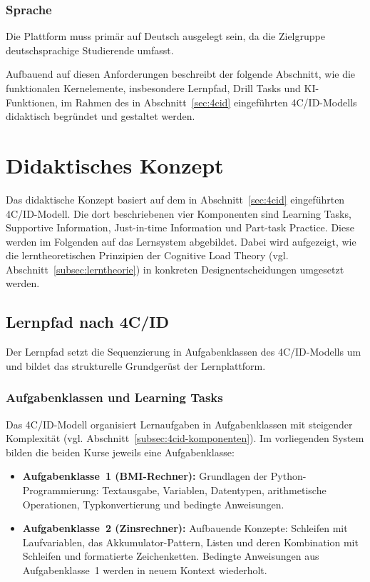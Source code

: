 \subsubsection{Sprache}

Die Plattform muss primär auf Deutsch ausgelegt sein, da die Zielgruppe deutschsprachige Studierende umfasst.

Aufbauend auf diesen Anforderungen beschreibt der folgende Abschnitt, wie die funktionalen Kernelemente, insbesondere Lernpfad, Drill Tasks und KI-Funktionen, im Rahmen des in Abschnitt~\ref{sec:4cid} eingeführten 4C/ID-Modells didaktisch begründet und gestaltet werden.


\section{Didaktisches Konzept}\label{sec:didaktik}

Das didaktische Konzept basiert auf dem in Abschnitt~\ref{sec:4cid} eingeführten 4C/ID-Modell.
Die dort beschriebenen vier Komponenten sind Learning Tasks, Supportive Information, Just-in-time Information und Part-task Practice. Diese werden im Folgenden auf das Lernsystem abgebildet.
Dabei wird aufgezeigt, wie die lerntheoretischen Prinzipien der Cognitive Load Theory (vgl. Abschnitt~\ref{subsec:lerntheorie}) in konkreten Designentscheidungen umgesetzt werden.

\subsection{Lernpfad nach 4C/ID}\label{subsec:lernpfad}

Der Lernpfad setzt die Sequenzierung in Aufgabenklassen des 4C/ID-Modells um und bildet das strukturelle Grundgerüst der Lernplattform.

\subsubsection{Aufgabenklassen und Learning Tasks}

Das 4C/ID-Modell organisiert Lernaufgaben in Aufgabenklassen mit steigender Komplexität (vgl. Abschnitt~\ref{subsec:4cid-komponenten}).
Im vorliegenden System bilden die beiden Kurse jeweils eine Aufgabenklasse:

\begin{itemize}
    \item \textbf{Aufgabenklasse~1 (BMI-Rechner):} Grundlagen der Python-Programmierung: Textausgabe, Variablen, Datentypen, arithmetische Operationen, Typkonvertierung und bedingte Anweisungen.
    \item \textbf{Aufgabenklasse~2 (Zinsrechner):} Aufbauende Konzepte: Schleifen mit Laufvariablen, das Akkumulator-Pattern, Listen und deren Kombination mit Schleifen und formatierte Zeichenketten. Bedingte Anweisungen aus Aufgabenklasse~1 werden in neuem Kontext wiederholt.
\end{itemize}


